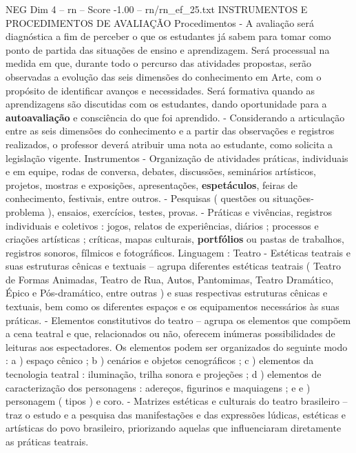 \begin{textsample}{NEG Dim 4 – rn – Score -1.00 – rn/rn\_ef\_25.txt}  \label{ex:f4_neg_207}
INSTRUMENTOS E PROCEDIMENTOS DE AVALIAÇÃO Procedimentos - A avaliação será diagnóstica a fim de perceber o que os estudantes já sabem para tomar como ponto de partida das situações de ensino e aprendizagem.
Será processual na medida em que, durante todo o percurso das atividades propostas, serão observadas a evolução das seis dimensões do conhecimento em Arte, com o propósito de identificar avanços e necessidades.
Será formativa quando as aprendizagens são discutidas com os estudantes, dando oportunidade para a \textbf{autoavaliação} e consciência do que foi aprendido. - Considerando a articulação entre as seis dimensões do conhecimento e a partir das observações e registros realizados, o professor deverá atribuir uma nota ao estudante, como solicita a legislação vigente.
Instrumentos - Organização de atividades práticas, individuais e em equipe, rodas de conversa, debates, discussões, seminários artísticos, projetos, mostras e exposições, apresentações, \textbf{espetáculos}, feiras de conhecimento, festivais, entre outros. - Pesquisas ( questões ou situações-problema ), ensaios, exercícios, testes, provas. - Práticas e vivências, registros individuais e coletivos : jogos, relatos de experiências, diários ; processos e criações artísticas ; críticas, mapas culturais, \textbf{portfólios} ou pastas de trabalhos, registros sonoros, fílmicos e fotográficos.
Linguagem : Teatro - Estéticas teatrais e suas estruturas cênicas e textuais – agrupa diferentes estéticas teatrais ( Teatro de Formas Animadas, Teatro de Rua, Autos, Pantomimas, Teatro Dramático, Épico e Pós-dramático, entre outras ) e suas respectivas estruturas cênicas e textuais, bem como os diferentes espaços e os equipamentos necessários às suas práticas. - Elementos constitutivos do teatro – agrupa os elementos que compõem a cena teatral e que, relacionados ou não, oferecem inúmeras possibilidades de leituras aos espectadores.
Os elementos podem ser organizados do seguinte modo : a ) espaço cênico ; b ) cenários e objetos cenográficos ; c ) elementos da tecnologia teatral : iluminação, trilha sonora e projeções ; d ) elementos de caracterização dos personagens : adereços, figurinos e maquiagens ; e e ) personagem ( tipos ) e coro. - Matrizes estéticas e culturais do teatro brasileiro – traz o estudo e a pesquisa das manifestações e das expressões lúdicas, estéticas e artísticas do povo brasileiro, priorizando aquelas que influenciaram diretamente as práticas teatrais.

\end{textsample}
